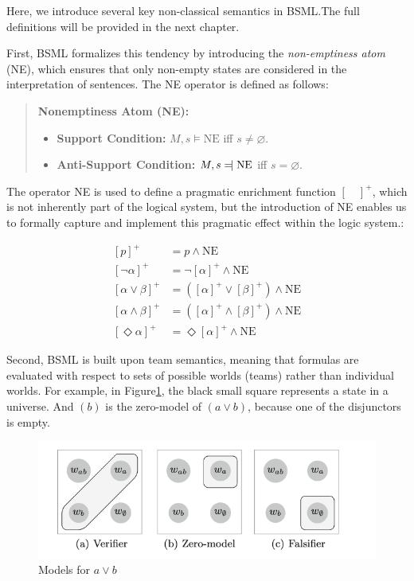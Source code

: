 Here, we introduce several key non-classical semantics in BSML.\@ The full definitions will be provided in the next chapter.\@


First, BSML formalizes this tendency by introducing the \textit{non-emptiness atom} (NE), which ensures that only non-empty states are considered in the interpretation of sentences. 
The NE operator is defined as follows:  

\begin{quote}
    \textbf{Nonemptiness Atom (NE):} 
    \begin{itemize}
        \item \textbf{Support Condition:} $M, s \models \text{NE}$ iff $s \neq \varnothing$.
        \item \textbf{Anti-Support Condition:} $M, s \leftmodels \text{NE}$ iff $s = \varnothing$.
    \end{itemize}
\end{quote}


    The operator NE is used to define a pragmatic enrichment function \({[ \quad]}^+\), which is not inherently part of the logical system, 
    but the introduction of NE enables us to formally capture and implement this pragmatic effect within the logic system.:


\begin{align*}
    {[p]}^+ &= p \land \text{NE} \\
    {[\neg \alpha]}^+ &= \neg {[\alpha]}^+ \land \text{NE} \\
    {[\alpha \lor \beta]}^+ &= ({[\alpha]}^+ \lor {[\beta]}^+) \land \text{NE} \\
    {[\alpha \land \beta]}^+ &= ({[\alpha]}^+ \land {[\beta]}^+) \land \text{NE} \\
    {[\Diamond \alpha]}^+ &= \Diamond {[\alpha]}^+ \land \text{NE}
\end{align*}

Second, BSML is built upon team semantics, meaning that formulas are evaluated with respect to sets of possible worlds (teams) rather than individual worlds. 
For example, in Figure\ref{disjunct}, the black small square represents a state in a universe.
And \( (b) \) is the zero-model of \( ( a \vee b ) \), because one of the disjunctors is empty.

\begin{figure}[h]
    \centering
    \includegraphics[width=\textwidth]{image/disj1.png}
    \caption{Models for \( a \vee b \)}\label{disjunct}
\end{figure}

